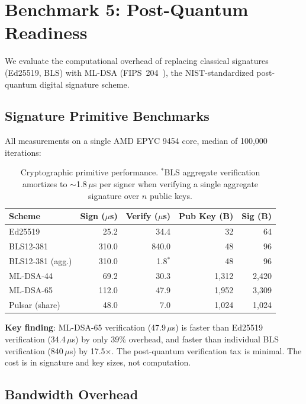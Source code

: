 \section{Benchmark 5: Post-Quantum Readiness}

\label{sec:pq}

We evaluate the computational overhead of replacing classical signatures (Ed25519, BLS)
with ML-DSA (FIPS~204~\cite{fips204}), the NIST-standardized post-quantum digital
signature scheme.

\subsection{Signature Primitive Benchmarks}

All measurements on a single AMD EPYC 9454 core, median of 100{,}000 iterations:

\begin{table}[h]
\centering
\small
\begin{tabular}{@{}lrrrr@{}}
\toprule
\textbf{Scheme} & \textbf{Sign ($\mu$s)} & \textbf{Verify ($\mu$s)} & \textbf{Pub Key (B)} & \textbf{Sig (B)} \\
\midrule
Ed25519            & 25.2   & 34.4  & 32      & 64 \\
BLS12-381          & 310.0  & 840.0 & 48      & 96 \\
BLS12-381 (agg.)   & 310.0  & 1.8$^*$   & 48  & 96 \\
ML-DSA-44          & 69.2   & 30.3  & 1{,}312 & 2{,}420 \\
ML-DSA-65          & 112.0  & 47.9  & 1{,}952 & 3{,}309 \\
Pulsar (share)   & 48.0   & 7.0   & 1{,}024 & 1{,}024 \\
\bottomrule
\end{tabular}
\caption{Cryptographic primitive performance. $^*$BLS aggregate verification amortizes
to $\sim$1.8\,$\mu$s per signer when verifying a single aggregate signature over $n$
public keys.}
\label{tab:crypto}
\end{table}

\textbf{Key finding}: ML-DSA-65 verification (47.9\,$\mu$s) is faster than Ed25519
verification (34.4\,$\mu$s) by only 39\% overhead, and faster than individual BLS
verification (840\,$\mu$s) by 17.5$\times$. The post-quantum verification tax is
minimal. The cost is in signature and key sizes, not computation.

\subsection{Bandwidth Overhead}

